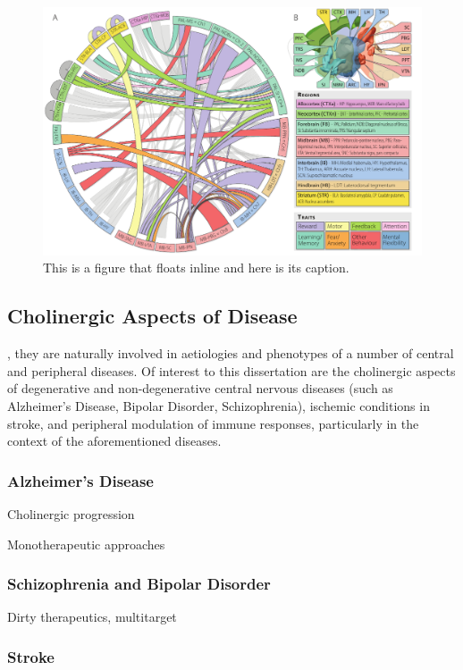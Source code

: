 \begin{figure}
\includegraphics[width=\textwidth]{figures/projections}
\caption[Short figure name.]{This is a figure that floats inline and here is its caption.
\label{fig:projections}}
\end{figure}

\subsection{Cholinergic Aspects of Disease}
, they are naturally involved in aetiologies and phenotypes of a number of central and peripheral diseases. Of interest to this dissertation are the cholinergic aspects of degenerative and non-degenerative central nervous diseases (such as Alzheimer's Disease, Bipolar Disorder, Schizophrenia), ischemic conditions in stroke, and peripheral modulation of immune responses, particularly in the context of the aforementioned diseases.

\subsubsection{Alzheimer's Disease}
Cholinergic progression

Monotherapeutic approaches

\subsubsection{Schizophrenia and Bipolar Disorder}
Dirty therapeutics, multitarget

\subsubsection{Stroke}

